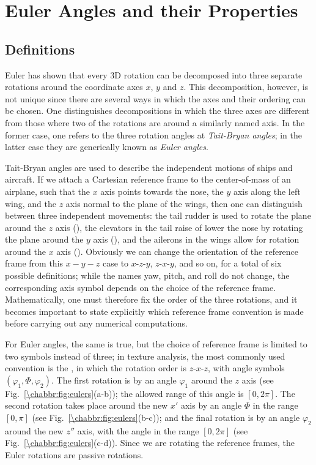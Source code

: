 \section{Euler Angles and their Properties}\label{\chabbr:sec:eulerangles}

\subsection{Definitions}\label{\chabbr:ssec:definitions}
Euler has shown that every 3D rotation can be decomposed into three separate rotations around the coordinate axes $x$, $y$ and $z$. This decomposition, however, is not unique since there are several ways in which the axes and their ordering can be chosen.  One distinguishes decompositions in which the three axes are different from those where two of the rotations are around a similarly named axis.  In the former case, one refers to the three rotation angles at \textit{Tait-Bryan angles}; in the latter case they are generically known as \textit{Euler angles}.  

Tait-Bryan angles are used to describe the independent motions of ships and aircraft.  If we attach a Cartesian reference frame to the center-of-mass of an airplane, such that the $x$ axis points towards the nose, the $y$ axis along the left wing, and the $z$ axis normal to the plane of the wings, then one can distinguish between three independent movements: the tail rudder is used to rotate the plane around the $z$ axis (), the elevators in the tail raise of lower the nose by rotating the plane around the $y$ axis (), and the ailerons in the wings allow for rotation around the $x$ axis ().  Obviously we can change the orientation of the reference frame from this $x-y-z$ case to $x$-$z$-$y$, $z$-$x$-$y$, and so on, for a total of six possible definitions; while the names yaw, pitch, and roll do not change, the corresponding axis symbol depends on the choice of the reference frame.  Mathematically, one must therefore fix the order of the three rotations, and it becomes important to state explicitly which reference frame convention is made before carrying out any numerical computations.

For Euler angles, the same is true, but the choice of reference frame is limited to two symbols instead of three; in texture analysis, the most commonly used convention is the , in which the rotation order is $z$-$x$-$z$, with angle symbols $(\varphi_1,\Phi,\varphi_2)$.  The first rotation is by an angle $\varphi_1$ around the $z$ axis (see Fig.~\ref{\chabbr:fig:eulers}(a-b)); the allowed range of this angle is $[0,2\pi]$. The second rotation takes place around the new $x'$ axis by an angle $\Phi$ in the range $[0,\pi]$ (see Fig.~\ref{\chabbr:fig:eulers}(b-c)); and the final rotation is by an angle $\varphi_2$ around the new $z''$ axis, with the angle in the range $[0,2\pi]$ (see Fig.~\ref{\chabbr:fig:eulers}(c-d)).  Since we are rotating the reference frames, the Euler rotations are passive rotations.

